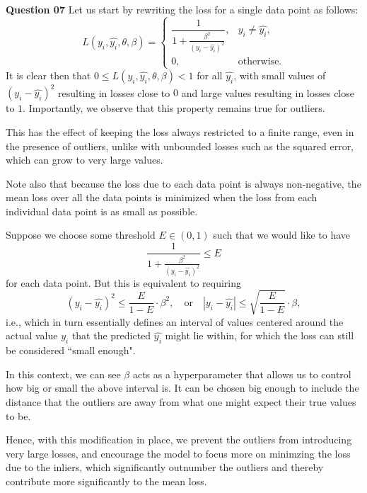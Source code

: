 \documentclass{article}[a4paper]
\begin{document}
	\textbf{Question 07} Let us start by rewriting the loss for a single data point as follows: \[
		L\left(y_i, \hat{y_i}, \theta, \beta\right)
		=
		\begin{cases}
			\dfrac{1}{1 + \frac{\beta^2}{\left(y_i - \hat{y_i}\right)^2}},	& y_i \ne \hat{y_i}, \\
			0,																& \text{otherwise}.
		\end{cases}
	\] It is clear then that $0 \leq L\left(y_i, \hat{y_i}, \theta, \beta\right) < 1$ for all $\hat{y_i}$, with
	small values of $\left(y_i - \hat{y_i}\right)^2$ resulting in losses close to $0$ and large values
	resulting in losses close to $1$. Importantly, we observe that this property remains true for outliers.
	\newline

	This has the effect of keeping the loss always restricted to a finite range, even in the presence of outliers,
	unlike with unbounded losses such as the squared error, which can grow to very large values.
	\newline
	
	Note also that because the loss due to each data point is always non-negative, the mean loss over all the data points is minimized
	when the loss from each individual data point is as small as possible.
	\newline
	
	Suppose we choose some threshold $E \in (0, 1)$ such that we would like to have \[
		\dfrac{1}{1 + \frac{\beta^2}{\left(y_i - \hat{y_i}\right)^2}} \leq E
	\] for each data point. But this is equivalent to requiring \[
		\left(y_i - \hat{y_i}\right)^2 \leq \dfrac{E}{1 - E} \cdot \beta^2,
		\quad \text{or} \quad
		\left|y_i - \hat{y_i}\right| \leq \sqrt{\dfrac{E}{1 - E}} \cdot \beta,
	\] i.e., which in turn essentially defines an interval of values centered around the actual value $y_i$ that the
	predicted $\hat{y_i}$ might lie within, for which the loss can still be considered ``small enough".
	\newline
	
	In this context, we can see $\beta$ acts as a hyperparameter that allows us to control how big or small the above interval is. It
	can be chosen big enough to include the distance that the outliers are away from what one might expect their true values to be.
	\newline

	Hence, with this modification in place, we prevent the outliers from introducing very large losses, and encourage
	the model to focus more on minimzing the loss due to the inliers, which significantly outnumber the outliers and thereby contribute
	more significantly to the mean loss.
	\newline
\end{document}
